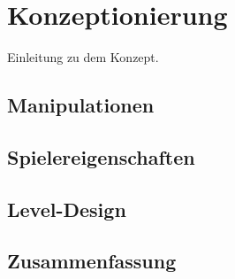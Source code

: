 \chapter{Konzeptionierung}
Einleitung zu dem Konzept. 

\section{Manipulationen}
\label{sec:konzept manipulationen}

\section{Spielereigenschaften}
\label{sec:konzept spielereigenschaften}

\section{Level-Design}
\label{sec:level design}

\section{Zusammenfassung}
\label{sec:zusammenfassung konzeption}

